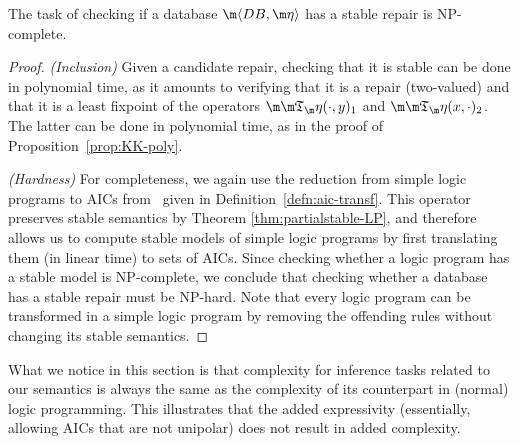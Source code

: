 \begin{proposition}\label{prop:stable-complexity}
  The task of checking if a database $\fulldb$ has a stable repair is NP-complete.
\end{proposition}
\begin{proof}
  \emph{(Inclusion)} Given a candidate repair, checking that it is stable can be done in polynomial time, as it amounts to verifying that it is a repair (two-valued) and that it is a least fixpoint of the operators $\Ap(\cdot,y)_1$ and $\Ap(x,\cdot)_2$.
  The latter can be done in polynomial time, as in the proof of Proposition~\ref{prop:KK-poly}.

  \emph{(Hardness)} For completeness, we again use the reduction from simple logic programs to AICs from~\cite{tplp/CaropreseT11} given in Definition~\ref{defn:aic-transf}.
  This operator preserves stable semantics by Theorem \ref{thm:partialstable-LP}, and therefore allows us to compute stable models of simple logic programs by first translating them (in linear time) to sets of AICs.
  Since checking whether a logic program has a stable model is NP-complete, we conclude that checking whether a database has a stable repair must be NP-hard.
  Note that every logic program can be transformed in a simple logic program by removing the offending rules without changing its stable semantics.
\end{proof}




What we notice in this section is that complexity for inference tasks related to our semantics is always the same as the complexity of its counterpart in (normal) logic programming. 
This illustrates that the added expressivity (essentially, allowing AICs that are not unipolar) does not result in added complexity. 

